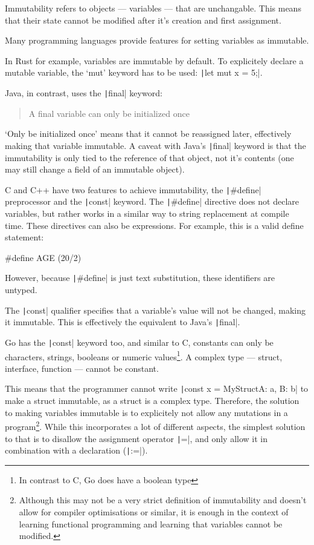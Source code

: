 Immutability refers to objects --- variables --- that are unchangable. This means
that their state cannot be modified after it's creation and first assignment.

Many programming languages provide features for setting variables as immutable.

In Rust for example, variables are immutable by default. To explicitely declare
a mutable variable, the `mut' keyword has to be used: \texttt|let mut x = 5;|.

Java, in contrast, uses the \texttt|final| keyword:
\begin{quote}
    A final variable can only be initialized once\autocite{final-java}
\end{quote}
`Only be initialized once' means that it cannot be reassigned later, effectively
making that variable immutable.
A caveat with Java's \texttt|final| keyword is that the immutability
is only tied to the reference of that object, not
it's contents (one may still change a field of an immutable object).

C and C++ have two features to achieve immutability, the \texttt|#define|
preprocessor and the \texttt|const| keyword.
The \texttt|#define| directive does not declare variables, but rather
works in a similar way to string replacement at compile time. These directives
can also be expressions. For example, this is a valid define statement:
\begin{ccode}
#define AGE (20/2)
\end{ccode}

However, because \texttt|#define| is just text substitution, these
identifiers are untyped.

The \texttt|const| qualifier specifies that a variable's value
will not be changed, making it immutable. This is effectively the equivalent
to Java's \texttt|final|.

Go has the \texttt|const| keyword too, and similar to C, constants can only be
characters, strings, booleans or numeric values\footnote{In contrast to C, Go does
have a boolean type}. A complex type --- struct, interface, function --- cannot be constant.

This means that the programmer cannot write
\texttt|const x = MyStruct{A: a, B: b}| to make a struct immutable,
as a struct is a complex type. Therefore, the solution to making variables
immutable is to explicitely not allow any mutations in a program\footnote{
    Although this may not be a very strict definition of immutability and doesn't
allow for compiler optimisations or similar, it is enough in the context of
learning functional programming and learning that variables cannot be modified.}.
While this incorporates a lot of different aspects, the simplest solution
to that is to disallow the assignment operator \texttt|=|, and only
allow it in combination with a declaration (\texttt|:=|).

